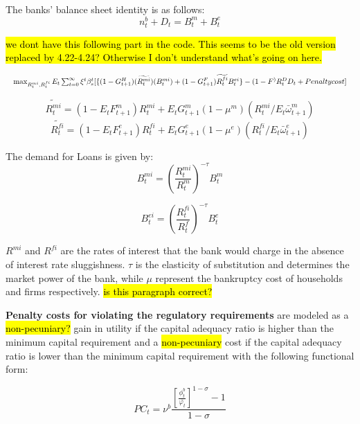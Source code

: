 \documentclass[12pt]{article}
\numberwithin{equation}{section}
\begin{document}
The banks' balance sheet identity is as follows:
\begin{equation}
n^b_{t}+D_{t}=B^m_{t}+B^e_{t}
\end{equation}


\hl{we dont have this following  part in the code. This seems to be the old version replaced by 4.22-4.24? Otherwise I don't understand what's going on here. }


\begin{equation}
\resizebox{1\textwidth}{!}{$
	\max_{R^{mi}_t,R^{fi}_t}E_t\sum _{t=0}^{\infty }\xi^t\beta_{s}^t [\{(1-G^H_{t+1}) (\widetilde{R^{mi}_{t}})(B^{mi}_{t})+(1-G^F_{t+1})\widetilde{R^{fi}_{t}}B^{ei}_{t}\}-(1-F^){R^D_{t}}D_{t}+Penalty cost]$}
\end{equation}



\begin{equation}
\widetilde{R^{mi}_{t}}=(1-E_tF^m_{t+1})R^{mi}_t+E_tG^m_{t+1}(1 - \mu^m)( R^{mi}_t/E_t\bar{\omega}^m_{t+1})
\end{equation}
\begin{equation}
\widetilde{R^{fi}_{t}}=(1-E_tF^e_{t+1})R^{fi}_t+E_tG^e_{t+1}(1 - \mu^e)( R^{fi}_t/E_t\bar{\omega}^e_{t+1})
\end{equation}

The demand for Loans is given by:
\begin{equation}
B^{mi}_t=(\frac{R^{mi}_t}{R^{m}_t})^{-\tau} B^{m}_t
\end{equation}

\begin{equation}
B^{ei}_t=(\frac{R^{fi}_t}{R^{f}_t})^{-\tau} B^{e}_t
\end{equation}



$R^{mi}$ and $R^{fi}$ are the rates of interest that the bank would charge in the absence of interest rate sluggishness. $\tau$ is the elasticity of substitution and determines the market power of the bank, while $\mu$ represent the bankruptcy cost of households and firms respectively. \hl{is this paragraph correct?} 

\textbf{Penalty costs for violating the regulatory requirements}  are modeled as a \hl{non-pecuniary?} gain in utility if the capital adequacy ratio is higher than the minimum capital requirement and a \hl{non-pecuniary} cost if the capital adequacy ratio is lower than the minimum capital requirement with the following functional form: 

\begin{equation}
PC_t=\nu^b \frac{[\frac{\phi^b_t}{\bar{\varphi_t}}]^{1-\sigma}-1}{{1-\sigma}}
\end{equation}
\end{document}
